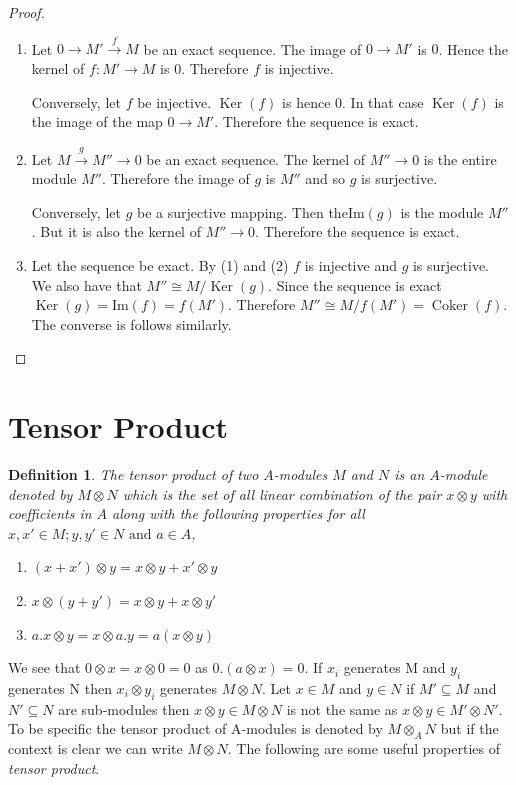 \documentclass[]{report}
\newtheorem{defn}[theorem]{Definition}
\DeclareMathOperator\Ker{Ker}
\DeclareMathOperator\Coker{Coker}
\begin{document}
\begin{proof}
    \begin{enumerate}
        \item Let $0 \rightarrow M' \xrightarrow{f} M$ be an exact sequence. The image of $0 \rightarrow M'$ is $0$. Hence the kernel of $f: M' \rightarrow M$ is $0$. Therefore $f$ is injective.

            Conversely, let $f$ be injective. $\Ker(f)$ is hence $0$. In that case $\Ker(f)$ is the image of the map $0 \rightarrow M'$. Therefore the sequence is exact.
        \item Let $M \xrightarrow{g} M'' \rightarrow 0$ be an exact sequence. The kernel of $M'' \rightarrow 0$ is the entire module $M''$. Therefore the image of $g$ is $M''$ and so $g$ is surjective.

            Conversely, let $g$ be a surjective mapping. Then the$\text{Im}(g)$ is the module $M''$. But it is also the kernel of $M'' \rightarrow 0$. Therefore the sequence is exact.
        \item Let the sequence be exact. By (1) and (2) $f$ is injective and $g$ is surjective. We also have that $M'' \cong M/\Ker(g)$. Since the sequence is exact $\Ker(g) = \text{Im}(f) = f(M')$. Therefore $M'' \cong M/f(M') = \Coker(f)$. The converse is follows similarly.
    \end{enumerate}
\end{proof}

\section{Tensor Product}

\begin{defn}
    The \textit{tensor product} of two $A$-modules $M$ and $N$ is an $A$-module denoted by $M\otimes N$ which is the set of all linear combination of the pair $x \otimes y$ with coefficients in $A$ along with the following properties for all $x,x' \in M; y, y' \in N \text{ and } a \in A$,
\begin{enumerate}
    \item $(x + x') \otimes y = x \otimes y + x' \otimes y$
    \item $x \otimes (y + y') = x \otimes y + x \otimes y'$
    \item $a.x \otimes y = x \otimes a.y = a(x \otimes y)$
\end{enumerate}
\end{defn}

We see that $0 \otimes x = x\otimes 0 = 0$ as $0.(a\otimes x) = 0$. If $x_i$ generates M and $y_i$ generates N then $x_i \otimes y_i$ generates $M\otimes N$. Let $x\in M$ and $y\in N$ if $M' \subseteq M$ and $N'\subseteq N$ are sub-modules then $x\otimes y \in M\otimes N$ is not the same as $x\otimes y \in M'\otimes N'$. To be specific the tensor product of A-modules is denoted by $M \otimes_A N$ but if the context is clear we can write $M\otimes N$. The following are some useful properties of \textit{tensor product}.
\end{document}
